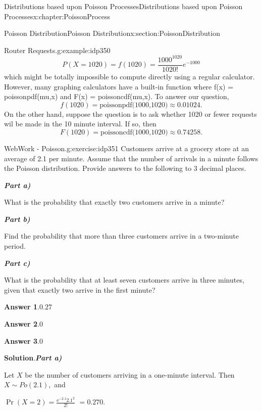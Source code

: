 \documentclass[oneside,10pt,]{book}
\newcommand{\blocktitlefont}{\relax}
\newcommand{\alert}[1]{\textbf{\textit{#1}}}
\numberwithin{equation}{section}
\begin{document}
\begin{chapterptx}{Distributions based upon Poisson Processes}{}{Distributions based upon Poisson Processes}{}{}{x:chapter:PoissonProcess}
\begin{sectionptx}{Poisson Distribution}{}{Poisson Distribution}{}{}{x:section:PoissonDistribution}
\begin{example}{Router Requests.}{g:example:idp350}
\begin{equation*}
P(X = 1020) = f(1020) = \frac{1000^{1020}}{1020!} e^{-1000}
\end{equation*}
which might be totally impossible to compute directly using a regular calculator. However, many graphing calculators have a built-in function where f(x) = poissonpdf(mu,x) and F(x) = poissoncdf(mu,x). To answer our question,%
\begin{equation*}
f(1020) = \text{poissonpdf(1000,1020)} \approx 0.01024.
\end{equation*}
On the other hand, suppose the question is to ask whether 1020 or fewer requests wil be made in the 10 minute interval. If so, then%
\begin{equation*}
F(1020) = \text{poissoncdf(1000,1020)} \approx 0.74258.
\end{equation*}
%
\end{example}
%
\begin{inlineexercise}{WebWork - Poisson.}{g:exercise:idp351}%
Customers arrive at a grocery store at an average of 2.1 per minute. Assume that the number of arrivals in a minute follows the Poisson distribution. Provide answers to the following to 3 decimal places.%
\par
\alert{Part a)}%
\par
What is the probability that exactly two customers arrive in a minute?%
\par
\alert{Part b)}%
\par
Find the probability that more than three customers arrive in a two-minute period.%
\par
\alert{Part c)}%
\par
What is the probability that at least seven customers arrive in three minutes, given that exactly two arrive in the first minute?%
\par\smallskip%
\noindent\textbf{\blocktitlefont Answer 1}.\hypertarget{g:answer:idp352}{}\quad{}\(0.27\)%
\par\smallskip%
\noindent\textbf{\blocktitlefont Answer 2}.\hypertarget{g:answer:idp353}{}\quad{}\(0\)%
\par\smallskip%
\noindent\textbf{\blocktitlefont Answer 3}.\hypertarget{g:answer:idp354}{}\quad{}\(0\)%
\par\smallskip%
\noindent\textbf{\blocktitlefont Solution}.\hypertarget{g:solution:idp355}{}\quad{}\alert{Part a)}%
\par
Let \(X\) be the number of customers arriving in a one-minute interval. Then \(X \sim Po(2.1),\) and%
\par
\(\Pr(X = 2) = \frac{\text{e}^{-2.1} 2.1^2}{2!}\) \(= 0.270.\)%

\end{inlineexercise}
\end{sectionptx}
\end{chapterptx}
\end{document}
